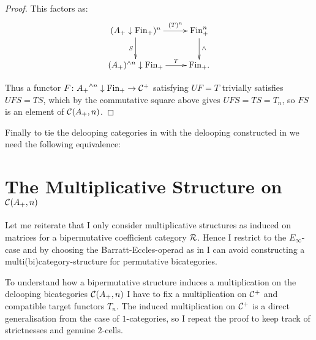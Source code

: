 {{{\begin{proof}
	This factors as: \[\xymatrix{(\Aix)^n \ar[r]^-{(T)^n}\ar[d]_{S}&\Fi^n
	\ar[d]^{\wedge}\\(A_+)^{\wedge n}\downarrow\Fi \ar[r]^-{T} & \Fi.}\]
	
	Thus a functor $F\colon {A_+}^{\wedge n}\downarrow \mathrm{Fin}_+ \rightarrow 
	\mathcal{C}^+$ satisfying $UF = T$ trivially satisfies $UFS = TS$, which by
	the commutative square above gives $UFS = TS = T_n$, so $FS$ is
	an element of $\mathcal{C}(A_+,n)$.\end{proof}}}

Finally to tie the delooping categories in with the delooping 
constructed in \cite{Os} we need the following equivalence:
{}

\section{The Multiplicative Structure on $\mathcal{C}(A_+,n)$}
Let me reiterate that I only consider multiplicative structures as
induced on matrices for a bipermutative coefficient
category $\mathcal{R}$. Hence I restrict to the $E_\infty$-case and by 
choosing the Barratt-Eccles-operad as in 
\cite[p. 16, Theorem 3.7]{EM} I can avoid constructing a 
multi(bi)category-structure for permutative bicategories.

To understand how a bipermutative structure induces a multiplication
on the delooping bicategories $\mathcal{C}(A_+,n)$ I have to fix a 
multiplication on $\mathcal{C}^+$ and compatible target functors
$T_n$. The induced multiplication on $\mathcal{C}^+$
is a direct generalisation from the case of $1$-categories, so I repeat 
the proof to keep track of strictnesses and genuine $2$-cells.

}
